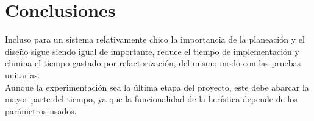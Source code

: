 \documentclass[a4paper]{article}
\begin{document}
%
\section*{Conclusiones}
Incluso para un sistema relativamente chico la importancia de la planeaci\'on y el diseño  sigue siendo igual de importante, reduce el tiempo de implementaci\'on y elimina el tiempo gastado por refactorizaci\'on, del mismo modo con las pruebas unitarias.   \\

Aunque la experimentaci\'on sea la \'ultima etapa del proyecto, este debe abarcar la mayor parte del tiempo, ya que la funcionalidad de la her\'istica depende de los par\'ametros usados.

{}

\end{document}
